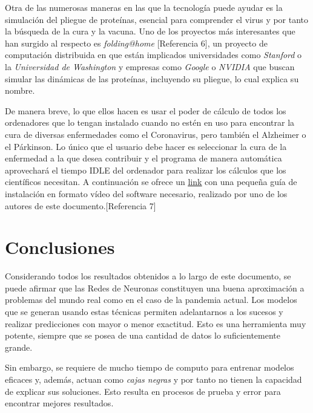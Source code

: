 \documentclass[12pt,a4paper, xcolor=table]{article}
\begin{document}
      Otra de las numerosas maneras en las que la tecnología puede ayudar es la simulación del pliegue de proteínas, esencial para comprender el virus y por tanto la búsqueda de la cura y la vacuna. Uno de los proyectos más interesantes que han surgido al respecto es \textit{folding@home} [Referencia 6], un proyecto de computación distribuida en que están implicados universidades como \textit{Stanford} o la \textit{Universidad de Washington} y empresas como \textit{Google} o \textit{NVIDIA} que buscan simular las dinámicas de las proteínas, incluyendo su pliegue, lo cual explica su nombre.

      \vspace{2mm}

      De manera breve, lo que ellos hacen es usar el poder de cálculo de todos los ordenadores que lo tengan instalado cuando no estén en uso para encontrar la cura de diversas enfermedades como el Coronavirus, pero también el Alzheimer o el Párkinson. Lo único que el usuario debe hacer es seleccionar la cura de la enfermedad a la que desea contribuir y el programa de manera automática aprovechará el tiempo IDLE del ordenador para realizar los cálculos que los científicos necesitan. A continuación se ofrece un  \href{https://www.youtube.com/watch?v=xqvAHnac79U}{\underline{link}} con una pequeña guía de instalación en formato vídeo del software necesario, realizado por uno de los autores de este documento.[Referencia 7]



      \newpage

    \section{Conclusiones}

    Considerando todos los resultados obtenidos a lo largo de este documento, se puede afirmar que las Redes de Neuronas constituyen una buena aproximación a problemas del mundo real como en el caso de la pandemia actual. Los modelos que se generan usando estas técnicas permiten adelantarnos a los sucesos y realizar predicciones con mayor o menor exactitud. Esto es una herramienta muy potente, siempre que se posea de una cantidad de datos lo suficientemente grande.

    \vspace{2mm}

    Sin embargo, se requiere de mucho tiempo de computo para entrenar modelos eficaces y, además, actuan como \textit{cajas negras} y por tanto no tienen la capacidad de explicar sus soluciones. Esto resulta en procesos de prueba y error para encontrar mejores resultados.
\end{document}
